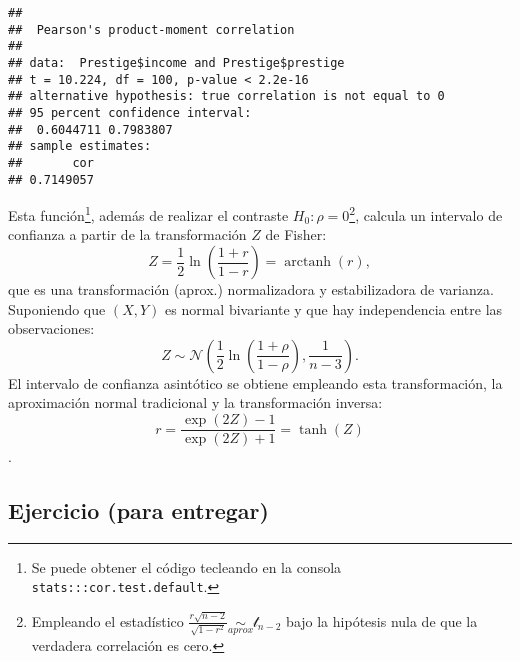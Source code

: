\documentclass[
]{book}
\theoremstyle{definition}
\theoremstyle{definition}
\theoremstyle{definition}
\theoremstyle{remark}
\begin{document}
\begin{verbatim}
## 
##  Pearson's product-moment correlation
## 
## data:  Prestige$income and Prestige$prestige
## t = 10.224, df = 100, p-value < 2.2e-16
## alternative hypothesis: true correlation is not equal to 0
## 95 percent confidence interval:
##  0.6044711 0.7983807
## sample estimates:
##       cor 
## 0.7149057
\end{verbatim}

Esta función\footnote{Se puede obtener el código tecleando en la consola \texttt{stats:::cor.test.default}.},
además de realizar el contraste \(H_0: \rho = 0\)\footnote{Empleando el estadístico
  \(\frac{r\sqrt{n - 2}}{\sqrt{1 - r^2}} \underset{aprox}{\sim } \mathcal{t}_{n-2}\)
  bajo la hipótesis nula de que la verdadera correlación es cero.},
calcula un intervalo de confianza a partir de la transformación \(Z\) de Fisher:
\[Z = \frac{1}{2}\ln \left( \frac{1+r}{1-r} \right) = \operatorname{arctanh}(r),\]
que es una transformación (aprox.) normalizadora y estabilizadora de varianza.
Suponiendo que \((X, Y)\) es normal bivariante y que hay independencia entre las observaciones:
\[Z \sim \mathcal{N}\left( \frac{1}{2}\ln \left( \frac{1+\rho}{1-\rho} \right), \frac{1}{n-3} \right).\]
El intervalo de confianza asintótico se obtiene empleando esta transformación,
la aproximación normal tradicional y la transformación inversa:
\[r = \frac{\exp(2Z)-1}{\exp(2Z)+1} = \operatorname{tanh}(Z)\].

\hypertarget{ejercicio-para-entregar}{%
\subsection{Ejercicio (para entregar)}\label{ejercicio-para-entregar}}
\end{document}

